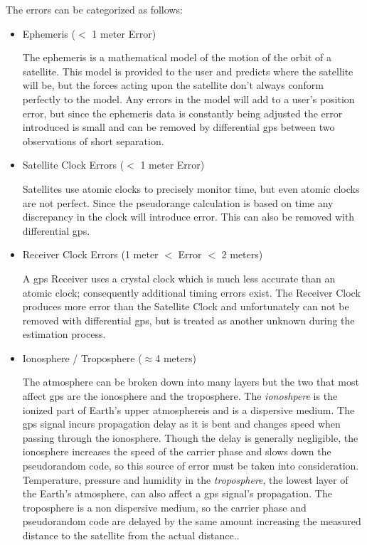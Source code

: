 \noindent
The errors can be categorized as follows:

\begin{itemize}
	\item Ephemeris ($<$ 1 meter Error)

The ephemeris is a mathematical model of the motion of the orbit of a satellite. This model is provided to the user and predicts where the satellite will be, but the forces acting upon the satellite don't always conform perfectly to the model. Any errors in the model will add to a user's position error, but since the ephemeris data is constantly being adjusted the error introduced is small and can be removed by differential \ac{gps} between two observations of short separation.

	\item Satellite Clock Errors ($<$ 1 meter Error)

Satellites use atomic clocks to precisely monitor time, but even atomic clocks are not perfect.  Since the pseudorange calculation is based on time any discrepancy in the clock will introduce error.  This can also be removed with differential \ac{gps}.

	\item Receiver Clock Errors (1 meter $<$ Error $<$ 2 meters)

A \ac{gps} Receiver uses a crystal clock which is much less accurate than an atomic clock; consequently additional timing errors exist.  The Receiver Clock produces more error than the Satellite Clock and unfortunately can not be removed with differential \ac{gps}, but is treated as another unknown during the estimation process.

	\item Ionosphere / Troposphere ($\approx$4 meters)

The atmosphere can be broken down into many layers but the two that most affect \ac{gps} are the ionosphere and the troposphere.  The \textit{ionoshpere} is the ionized part of Earth's upper atmosphereis and is a dispersive medium. The \ac{gps} signal incurs propagation delay as it is bent and changes speed when passing through the ionosphere. Though the delay is generally negligible, the ionosphere increases the speed of the carrier phase and slows down the pseudorandom code, so this source of error must be taken into consideration.  Temperature, pressure and humidity in the \textit{troposphere}, the lowest layer of the Earth's atmosphere, can also affect a \ac{gps} signal's propagation. The troposphere is a non dispersive medium, so the carrier phase and pseudorandom code are delayed by the same amount increasing the measured distance to the satellite from the actual distance.\cite[]{EL-RABBANY}.


\end{itemize}

